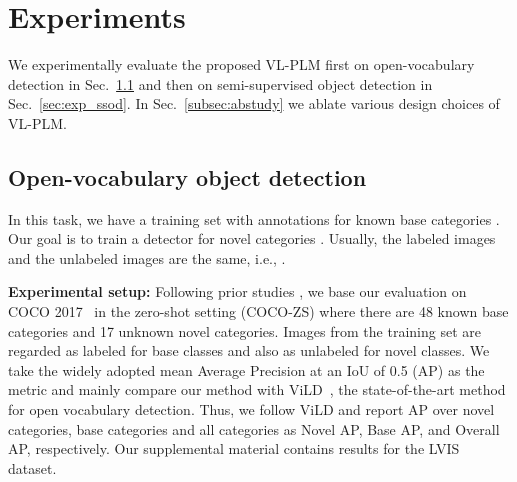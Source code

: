\documentclass[runningheads]{llncs}
\begin{document}
\section{Experiments}

We experimentally evaluate the proposed VL-PLM first on open-vocabulary detection in Sec.~\ref{sec:exp_ovd} and then on semi-supervised object detection in Sec.~\ref{sec:exp_ssod}.  In Sec.~\ref{subsec:abstudy} we ablate various design choices of VL-PLM.

\subsection{Open-vocabulary object detection}
\label{sec:exp_ovd}
In this task, we have a training set with annotations for known base categories . Our goal is to train a detector for novel categories . Usually, the labeled images  and the unlabeled images  are the same, i.e., .

\vspace{1mm}
\noindent \textbf{Experimental setup:} 
Following prior studies \cite{bansal2018zero,gao2021open,gu_iclr_22,zareian_cvpr_21}, we base our evaluation on COCO 2017~\cite{COCO} in the zero-shot setting (COCO-ZS) where there are 48 known base categories and 17 unknown novel categories. 
Images from the training set are regarded as labeled for base classes and also as unlabeled for novel classes.
We take the widely adopted mean Average Precision at an IoU of 0.5 (AP) as the metric and mainly compare our method with ViLD~\cite{gu_iclr_22}, the state-of-the-art method for open vocabulary detection.
Thus, we follow ViLD and report AP over novel categories, base categories and all categories as Novel AP, Base AP, and Overall AP, respectively.
Our supplemental material contains results for the LVIS~\cite{gupta2019lvis} dataset.
\end{document}
